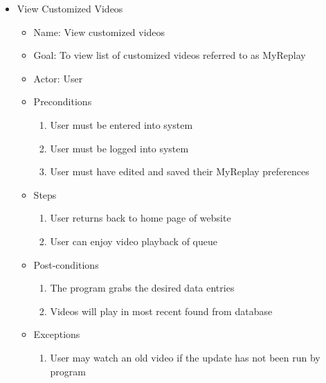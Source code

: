 \begin{itemize}
\item View Customized Videos
	\begin{itemize}
	\item Name: View customized videos 
    \item Goal: To view list of customized videos referred to as MyReplay
    \item Actor: User
    \item Preconditions
		\begin{enumerate}
		\item User must be entered into system
        \item User must be logged into system
       	\item User must have edited and saved their MyReplay preferences
        \end{enumerate}
    \item Steps
    	\begin{enumerate}
		\item User returns back to home page of website
        \item User can enjoy video playback of queue
        \end{enumerate}
    \item Post-conditions
    	\begin{enumerate}
		\item The program grabs the desired data entries
        \item Videos will play in most recent found from database
        \end{enumerate}
    \item Exceptions
    	\begin{enumerate}
    	\item User may watch an old video if the update has not been run by program
    	\end{enumerate}
    \end{itemize}
    

\end{itemize}
